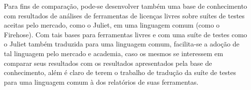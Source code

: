 Para fins de comparação, pode-se desenvolver também uma base de conhecimento com resultados de análises de  ferramentas de licenças livres sobre suítes de testes aceitas pelo mercado, como o Juliet, em uma linguagem comum (como o Firehose). Com tais bases para ferramentas livres e com uma suíte de testes como o Juliet também traduzida para uma linguagem comum, facilita-se a adoção de tal linguagem pelo mercado e academia, caso os mesmos se interessem em comparar seus resultados com os resultados apresentados pela base de conhecimento, além é claro de terem o trabalho de tradução da suíte de testes para uma linguagem comum à dos relatórios de suas ferramentas.

